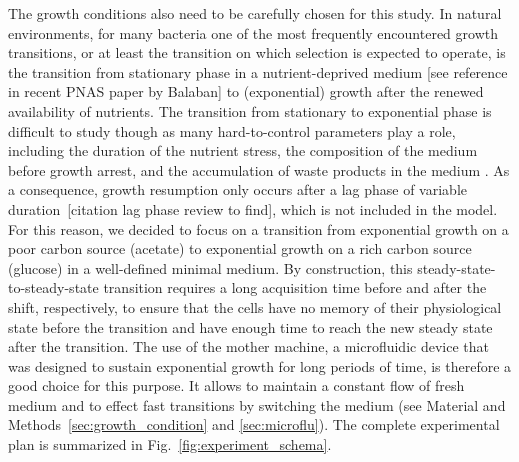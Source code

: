 The growth conditions also need to be carefully chosen for this study.
In natural environments, for many bacteria one of the most frequently encountered growth transitions, or at least the transition on which selection is expected to operate, is the transition from stationary phase in a nutrient-deprived medium [see reference in recent PNAS paper by Balaban] to (exponential) growth after the renewed availability of nutrients.
The transition from stationary to exponential phase is difficult to study though as many hard-to-control parameters play a role, including the duration of the nutrient stress, the composition of the medium before growth arrest, and the accumulation of waste products in the medium \cite{reviewBremerDennisBiochimie}.
As a consequence, growth resumption only occurs after a lag phase of variable duration~[citation lag phase review to find], which is not included in the model.
For this reason, we decided to focus on a transition from exponential growth on a poor carbon source (acetate) to exponential growth on a rich carbon source (glucose) in a well-defined minimal medium.
By construction, this steady-state-to-steady-state transition requires a long acquisition time before and after the shift, respectively, to ensure that the cells have no memory of their physiological state before the transition and have enough time to reach the new steady state after the transition.
The use of the mother machine, a microfluidic device that was designed to sustain exponential growth for long periods of time, is therefore a good choice for this purpose.
It allows to maintain a constant flow of fresh medium and to effect fast transitions by switching the medium (see Material and Methods~\ref{sec:growth_condition} and \ref{sec:microflu}).
The complete experimental plan is summarized in Fig.~\ref{fig:experiment_schema}.

